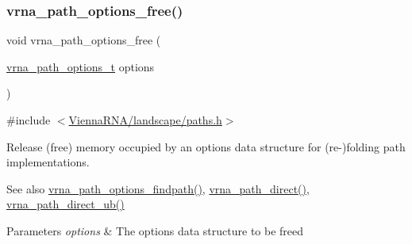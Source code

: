 \subsubsection{\texorpdfstring{vrna\_path\_options\_free()}{vrna\_path\_options\_free()}}
{\footnotesize\ttfamily void vrna\+\_\+path\+\_\+options\+\_\+free (\begin{DoxyParamCaption}\item[{\mbox{\hyperlink{group__paths_gaa99d8ec48f64de53eda0d51b1ed0d3d1}{vrna\+\_\+path\+\_\+options\+\_\+t}}}]{options }\end{DoxyParamCaption})}



{\ttfamily \#include $<$\mbox{\hyperlink{paths_8h}{Vienna\+R\+N\+A/landscape/paths.\+h}}$>$}



Release (free) memory occupied by an options data structure for (re-\/)folding path implementations. 

\begin{DoxySeeAlso}{See also}
\mbox{\hyperlink{group__paths__direct_ga3790a24ca64d68acfa6e67b525151a5f}{vrna\+\_\+path\+\_\+options\+\_\+findpath()}}, \mbox{\hyperlink{group__paths__direct_gacba096caf9a6fe134f33a5afcf2248d8}{vrna\+\_\+path\+\_\+direct()}}, \mbox{\hyperlink{group__paths__direct_ga51d9edaeb42d1d178ea8ba46ccd4c8c0}{vrna\+\_\+path\+\_\+direct\+\_\+ub()}}
\end{DoxySeeAlso}

\begin{DoxyParams}{Parameters}
{\em options} & The options data structure to be free\textquotesingle{}d \\
\hline
\end{DoxyParams}
